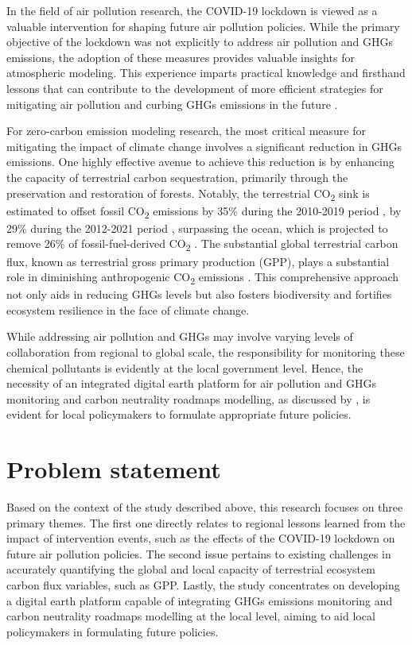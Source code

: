 In the field of air pollution research, the COVID-19 lockdown is viewed as a valuable intervention for shaping future air pollution policies. While the primary objective of the lockdown was not explicitly to address air pollution and GHGs emissions, the adoption of these measures provides valuable insights for atmospheric modeling. This experience imparts practical knowledge and firsthand lessons that can contribute to the development of more efficient strategies for mitigating air pollution and curbing GHGs emissions in the future \citep{grange2021covid}. \par

For zero-carbon emission modeling research, the most critical measure for mitigating the impact of climate change involves a significant reduction in GHGs emissions. One highly effective avenue to achieve this reduction is by enhancing the capacity of terrestrial carbon sequestration, primarily through the preservation and restoration of forests. Notably, the terrestrial CO\textsubscript{2} sink is estimated to offset fossil CO\textsubscript{2} emissions by 35\% during the 2010-2019 period \citep{friedlingstein2020global, wang2022disentangling}, by 29\% during the 2012-2021 period \citep{essd-14-4811-2022}, surpassing the ocean, which is projected to remove 26\% of fossil-fuel-derived CO\textsubscript{2} \citep{essd-14-4811-2022}. The substantial global terrestrial carbon flux, known as terrestrial gross primary production (GPP), plays a substantial role in diminishing anthropogenic CO\textsubscript{2} emissions \citep{beer2010terrestrial}. This comprehensive approach not only aids in reducing GHGs levels but also fosters biodiversity and fortifies ecosystem resilience in the face of climate change. \par

While addressing air pollution and GHGs may involve varying levels of collaboration from regional to global scale, the responsibility for monitoring these chemical pollutants is evidently at the local government level. Hence, the necessity of an integrated digital earth platform for air pollution and GHGs monitoring and carbon neutrality roadmaps modelling, as discussed by \citep{fukui2021digital}, is evident for local policymakers to formulate appropriate future policies. \par

\section{Problem statement}
Based on the context of the study described above, this research focuses on three primary themes. The first one directly relates to regional lessons learned from the impact of intervention events, such as the effects of the COVID-19 lockdown on future air pollution policies. The second issue pertains to existing challenges in accurately quantifying the global and local capacity of terrestrial ecosystem carbon flux variables, such as GPP. Lastly, the study concentrates on developing a digital earth platform capable of integrating GHGs emissions monitoring and carbon neutrality roadmaps modelling at the local level, aiming to aid local policymakers in formulating future policies. \par

